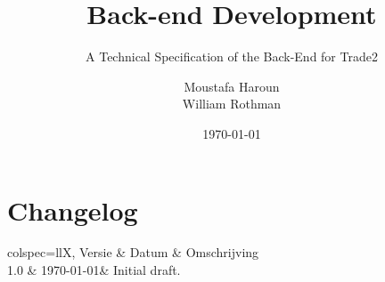 \documentclass[fleqn,12pt]{article}
\title{Back-end Development}
\subtitle{A Technical Specification of the Back-End for Trade2}
\author{Moustafa Haroun\\William Rothman} %
\date{\today}
\begin{document}
\maketitle

\newpage
\section{Changelog}\label{sec:changelog}

\begin{htable}[
		caption = {Changelog},
		label = {tab:changelog},
	]{
		colspec={llX},
	}
	Versie & Datum & Omschrijving \\
	1.0 & \today & Initial draft. \\
\end{htable}

\newpage
\tableofcontents

\newpage


\newpage


\newpage


\newpage


\newpage


\newpage


\newpage


\newpage


\newpage
\printbibliography
\end{document}
